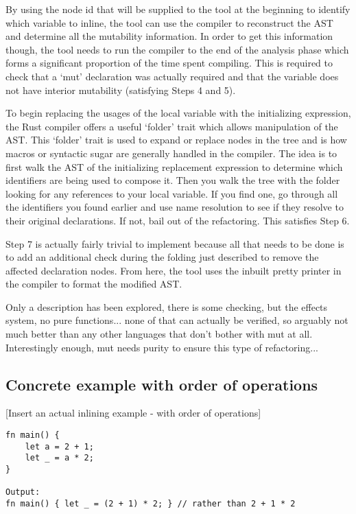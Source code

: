 By using the node id that will be supplied to the tool at the beginning to identify which variable to inline, the tool can use the compiler to reconstruct the AST and determine all the mutability information. In order to get this information though, the tool needs to run the compiler to the end of the analysis phase which forms a significant proportion of the time spent compiling. This is required to check that a `mut' declaration was actually required and that the variable does not have interior mutability (satisfying Steps 4 and 5).

To begin replacing the usages of the local variable with the initializing expression, the Rust compiler offers a useful `folder' trait which allows manipulation of the AST. This `folder' trait is used to expand or replace nodes in the tree and is how macros or syntactic sugar are generally handled in the compiler. The idea is to first walk the AST of the initializing replacement expression to determine which identifiers are being used to compose it. Then you walk the tree with the folder looking for any references to your local variable. If you find one, go through all the identifiers you found earlier and use name resolution to see if they resolve to their original declarations. If not, bail out of the refactoring. This satisfies Step 6.

Step 7 is actually fairly trivial to implement because all that needs to be done is to add an additional check during the folding just described to remove the affected declaration nodes. From here, the tool uses the inbuilt pretty printer in the compiler to format the modified AST.

Only a description has been explored, there is some checking, but the effects system, no pure functions... none of that can actually be verified, so arguably not much better than any other languages that don't bother with mut at all. Interestingly enough, mut needs purity to ensure this type of refactoring... 

\subsection{Concrete example with order of operations}
[Insert an actual inlining example - with order of operations]
\begin{verbatim}
fn main() {
    let a = 2 + 1;
    let _ = a * 2;
}

Output:
fn main() { let _ = (2 + 1) * 2; } // rather than 2 + 1 * 2
\end{verbatim}

